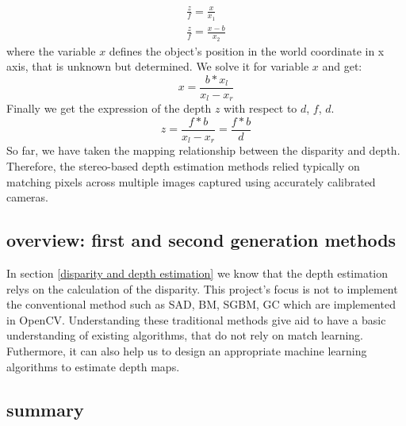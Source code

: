 \begin{gather}
\label{}
    \frac{z}{f} =  \frac{x}{x_1} \\
    \frac{z}{f} =  \frac{x-b}{x_2}
\end{gather}
where the variable $x$ defines the object's position in the world coordinate in x axis, that is unknown but determined. We solve it for variable $x$ and get: 
\begin{equation}
    x = \frac{b*x_l}{x_l-x_r}
\end{equation}
Finally we get the expression of the depth $z$ with respect to $d$, $f$, $d$.
\begin{equation}
    z = \frac{f*b}{x_l-x_r} = \frac{f*b}{d}
\end{equation}
So far, we have taken the mapping relationship between the disparity and depth. Therefore, the stereo-based depth estimation
methods relied typically on matching pixels across multiple images captured using accurately calibrated cameras. 

\subsection{overview: first and second generation methods}
\label{overview: first and second generation methods}
In section \ref{disparity and depth estimation} we know that the depth estimation relys on the calculation of the disparity. This project's focus is not to implement the conventional method such as SAD, BM, SGBM, GC which are implemented in OpenCV. Understanding these traditional methods give aid to have a basic understanding of existing algorithms, that do not rely on match learning. Futhermore, it can also help us to design an appropriate machine learning algorithms to estimate depth maps.

\subsection{summary}


